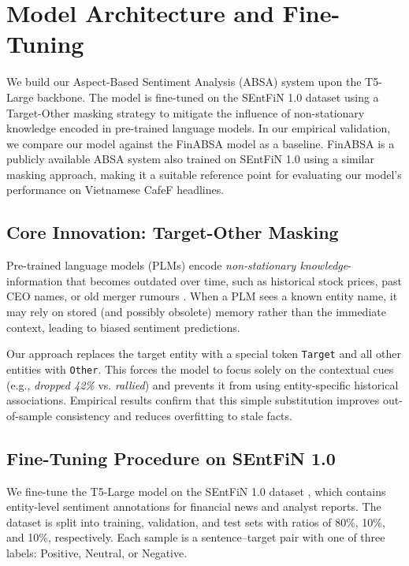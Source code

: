 \documentclass[12pt,a4paper]{article}
\begin{document}
\section{Model Architecture and Fine-Tuning}
We build our Aspect-Based Sentiment Analysis (ABSA) system upon the T5-Large backbone. The model is fine-tuned on the SEntFiN 1.0 dataset \cite{entfin-dataset} using a Target-Other masking strategy to mitigate the influence of non-stationary knowledge encoded in pre-trained language models. In our empirical validation, we compare our model against the FinABSA model \cite{son2023removing} as a baseline. FinABSA is a publicly available ABSA system also trained on SEntFiN 1.0 using a similar masking approach, making it a suitable reference point for evaluating our model's performance on Vietnamese CafeF headlines.

\subsection{Core Innovation: Target-Other Masking}
Pre-trained language models (PLMs) encode \textit{non-stationary knowledge}-information that becomes outdated over time, such as historical stock prices, past CEO names, or old merger rumours \cite{nonstationary-knowledge-arxiv}. When a PLM sees a known entity name, it may rely on stored (and possibly obsolete) memory rather than the immediate context, leading to biased sentiment predictions.

Our approach replaces the target entity with a special token \texttt{Target} and all other entities with \texttt{Other}. This forces the model to focus solely on the contextual cues (e.g., \textit{dropped 42\%} vs. \textit{rallied}) and prevents it from using entity-specific historical associations. Empirical results confirm that this simple substitution improves out-of-sample consistency and reduces overfitting to stale facts.

\subsection{Fine-Tuning Procedure on SEntFiN 1.0}
We fine-tune the T5-Large model on the SEntFiN 1.0 dataset \cite{entfin-dataset}, which contains entity-level sentiment annotations for financial news and analyst reports. The dataset is split into training, validation, and test sets with ratios of 80\%, 10\%, and 10\%, respectively. Each sample is a sentence--target pair with one of three labels: Positive, Neutral, or Negative.
\end{document}
